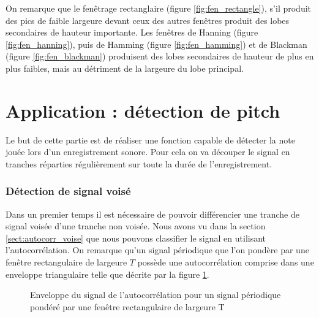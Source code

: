\documentclass[french]{article}
\begin{document}
On remarque que le fenêtrage rectanglaire (figure \ref{fig:fen_rectangle}), s'il produit des pics de faible largeure devant ceux des autres fenêtres produit des lobes secondaires de hauteur importante. Les fenêtres de Hanning (figure \ref{fig:fen_hanning}), puis de Hamming (figure \ref{fig:fen_hamming}) et de Blackman (figure \ref{fig:fen_blackman}) produisent des lobes secondaires de hauteur de plus en plus faibles, mais au détriment de la largeure du lobe principal.

\FloatBarrier
\clearpage
\part{Application : détection de pitch}

Le but de cette partie est de réaliser une fonction capable de détecter la note jouée lors d'un enregistrement sonore. Pour cela on va découper le signal en tranches réparties régulièrement sur toute la durée de l'enregistrement.

\section{Détection de signal voisé}

Dans un premier temps il est nécessaire de pouvoir différencier une tranche de signal voisée d'une tranche non voisée. Nous avons vu dans la section \ref{sect:autocorr_voise} que nous pouvons classifier le signal en utilisant l'autocorrélation. On remarque qu'un signal périodique que l'on pondère par une fenêtre rectangulaire de largeure $T$ possède une autocorrélation comprise dans une enveloppe triangulaire telle que décrite par la figure \ref{fig:enveloppe}.

\begin{figure}[h!]
	\centering
	\caption[Enveloppe de l'autocorrélation]{Enveloppe du signal de l'autocorrélation pour un signal périodique pondéré par une fenêtre rectangulaire de largeure T}
	\label{fig:enveloppe}
\end{figure}
\end{document}
